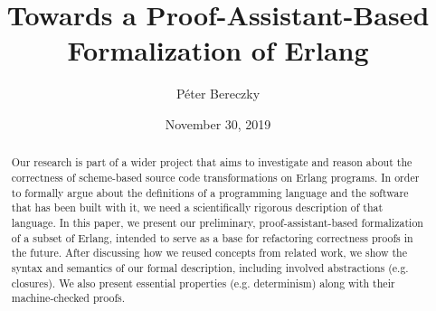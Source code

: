 \documentclass[12pt]{article}
\title{Towards a Proof-Assistant-Based Formalization of Erlang}
\author[1]{Péter Bereczky}
\date{November 30, 2019}
\affil[1]{Faculty of Informatics, Eötvös Loránd University, Hungary}
\theoremstyle{definition}
\numberwithin{equation}{section}
\begin{document}
\maketitle

\begin{abstract}
	
	
	
	 Our research is part of a wider project that aims to investigate and reason about the correctness of scheme-based source code transformations on Erlang programs. In order to formally argue about the definitions of a programming language and the software that has been built with it, we need a scientifically rigorous description of that language. In this paper, we present our preliminary, proof-assistant-based formalization of a subset of Erlang, intended to serve as a base for refactoring correctness proofs in the future. After discussing how we reused concepts from related work, we show the syntax and semantics of our formal description, including involved abstractions (e.g. closures). We also present essential properties (e.g. determinism) along with their machine-checked proofs.
	
\end{abstract}
\newpage
\tableofcontents
\newpage
\end{document}
